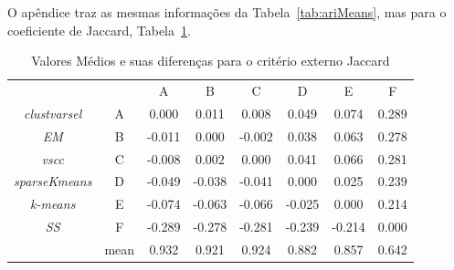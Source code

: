 \documentclass{acm_proc_article-sp}
\begin{document}
\appendix
O apêndice traz as mesmas informações da Tabela~\ref{tab:ariMeans}, mas para o coeficiente de Jaccard, Tabela~\ref{tab:jaccardMeans}.

\begin{table}[!t]
    \centering
    \begin{tabular}{cccccccc}
    \toprule
                   &        &  A     &  B    & C     & D     & E     & F \\
\textit{clustvarsel} & A    &  0.000 & 0.011 & 0.008 &\cellcolor{gray} 0.049 &\cellcolor{gray} 0.074 &\cellcolor{gray}0.289 \\
\textit{EM}          & B    & -0.011 & 0.000 &-0.002 & 0.038 &\cellcolor{gray} 0.063 &\cellcolor{gray}0.278 \\
\textit{vscc}        & C    & -0.008 & 0.002 & 0.000 &\cellcolor{gray} 0.041 &\cellcolor{gray} 0.066 &\cellcolor{gray}0.281 \\
\textit{sparseKmeans}& D    &\cellcolor{gray} -0.049 &-0.038 &\cellcolor{gray}-0.041 & 0.000 & 0.025 &\cellcolor{gray}0.239 \\
\textit{k-means}     & E    &\cellcolor{gray} -0.074 &\cellcolor{gray}-0.063 &\cellcolor{gray}-0.066 &-0.025 & 0.000 &\cellcolor{gray}0.214 \\
\textit{SS}          & F    &\cellcolor{gray} -0.289 &\cellcolor{gray}-0.278 &\cellcolor{gray}-0.281 &\cellcolor{gray}-0.239 &\cellcolor{gray}-0.214 &0.000 \\
    \midrule
            & mean      &  0.932 & 0.921 & 0.924 & 0.882 & 0.857 &0.642 \\
    \bottomrule
    \end{tabular}
    \caption{Valores Médios e suas diferenças para o critério externo Jaccard}
    \label{tab:jaccardMeans}
\end{table}



\balancecolumns
\end{document}
